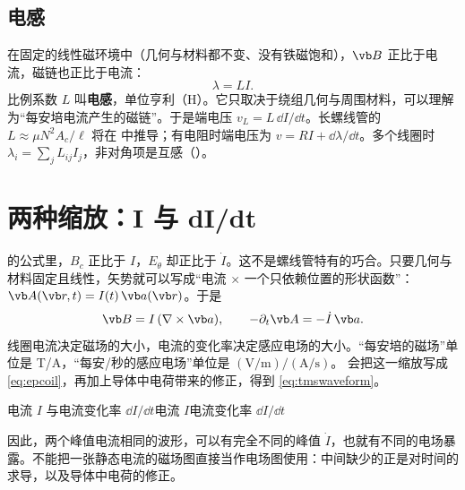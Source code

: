 \subsection{电感}
在固定的线性磁环境中（几何与材料都不变、没有铁磁饱和），$\vb B$ 正比于电流，磁链也正比于电流：
\begin{equation}
\lambda=LI .
\label{eq:inductance}
\end{equation}
比例系数 $L$ 叫\textbf{电感}，单位亨利（H）。它只取决于绕组几何与周围材料，可以理解为“每安培电流产生的磁链”。于是端电压 $v_L=L\,\dd I/\dd t$。长螺线管的 $L\approx\mu N^2A_c/\ell$ 将在 中推导；有电阻时端电压为 $v=RI+\dd\lambda/\dd t$。多个线圈时 $\lambda_i=\sum_jL_{ij}I_j$，非对角项是互感（）。

\section{两种缩放：I 与 dI/dt}\label{sec:magnetic-scaling}

 的公式里，$B_c$ 正比于 $I$，$E_\theta$ 却正比于 $\dot I$。这不是螺线管特有的巧合。只要几何与材料固定且线性，矢势就可以写成“电流 $\times$ 一个只依赖位置的形状函数”：$\vb A(\vb r,t)=I(t)\,\vb a(\vb r)$。于是
\begin{equation}
\vb B=I\,(\nabla\times\vb a),\qquad -\partial_t\vb A=-\dot I\,\vb a .
\end{equation}
线圈电流决定磁场的大小，电流的变化率决定感应电场的大小。“每安培的磁场”单位是 T/A，“每安/秒的感应电场”单位是 $(\mathrm{V/m})/(\mathrm{A/s})$。 会把这一缩放写成 \eqref{eq:epcoil}，再加上导体中电荷带来的修正，得到 \eqref{eq:tmswaveform}。

\begin{compare}{电流 $I$ 与电流变化率 $\dd I/\dd t$}{电流 $I$}{电流变化率 $\dd I/\dd t$}
\end{compare}

因此，两个峰值电流相同的波形，可以有完全不同的峰值 $\dot I$，也就有不同的电场暴露。不能把一张静态电流的磁场图直接当作电场图使用：中间缺少的正是对时间的求导，以及导体中电荷的修正。


